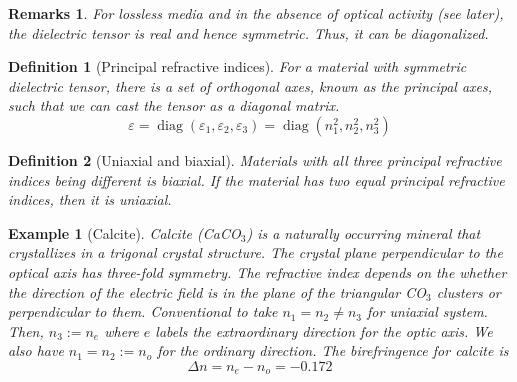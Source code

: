 \documentclass[a4paper]{article}
\DeclareMathOperator{\diag}{diag}
\newtheorem{remarks}{Remarks}[section]
\newtheorem{eg}{Example}[section]
\theoremstyle{new}
\newtheorem{defi}{Definition}[section]
\begin{document}
\begin{remarks}
For lossless media and in the absence of optical activity (see later), the dielectric tensor is real and hence symmetric. Thus, it can be diagonalized.
\end{remarks}
\begin{defi}[Principal refractive indices]
For a material with symmetric dielectric tensor, there is a set of orthogonal axes, known as the principal axes, such that we can cast the tensor as a diagonal matrix.
$$\varepsilon=\diag(\varepsilon_1,\varepsilon_2,\varepsilon_3)=\diag(n_1^2,n_2^2,n_3^2)$$
\end{defi}
\begin{defi}[Uniaxial and biaxial]
Materials with all three principal refractive indices being different is biaxial. If the material has two equal principal refractive indices, then it is uniaxial.
\end{defi}
\begin{eg}[Calcite]
Calcite (CaCO$_3$) is a naturally occurring mineral that crystallizes in a trigonal crystal structure. The crystal plane perpendicular to the optical axis has three-fold symmetry. The refractive index depends on the whether the direction of the electric field is in the plane of the triangular CO$_3$ clusters or perpendicular to them. Conventional to take $n_1=n_2\neq n_3$ for uniaxial system. Then, $n_3:=n_e$ where $e$ labels the extraordinary direction for the optic axis. We also have $n_1=n_2:=n_o$ for the ordinary direction. The birefringence for calcite is
$$\Delta n=n_e-n_o=-0.172$$
\end{eg}
\end{document}
